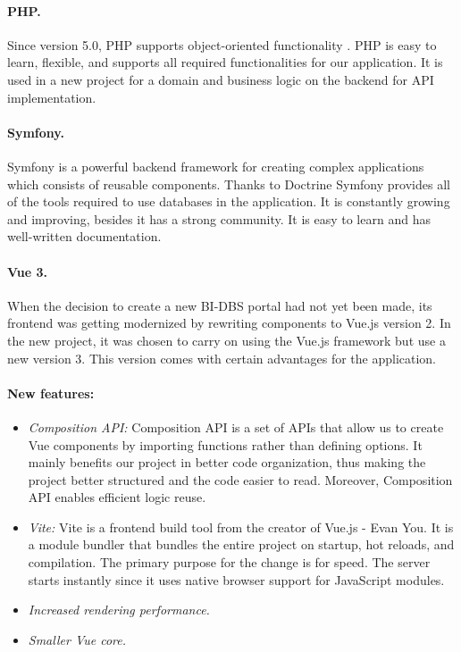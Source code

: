 \paragraph*{PHP.} Since version 5.0, PHP supports object-oriented functionality \cite{php-oop}. PHP is easy to learn, flexible, and supports all required functionalities for our application. It is used in a new project for a domain and business logic on the backend for API implementation.

\paragraph*{Symfony.} Symfony is a powerful backend framework for creating complex applications which consists of reusable components. \cite{symphony-doc} Thanks to Doctrine Symfony provides all of the tools required to use databases in the application. It is constantly growing and improving, besides it has a strong community. It is easy to learn and has well-written documentation.


\paragraph*{Vue 3.} When the decision to create a new BI-DBS portal had not yet been made, its frontend was getting modernized by rewriting components to Vue.js version 2. In the new project, it was chosen to carry on using the Vue.js framework but use a new version 3. This version comes with certain advantages for the application. \cite{vue3-updates}

\paragraph*{New features:}
\begin{itemize}
  \item \emph{Composition API:} Composition API is a set of APIs that allow us to create Vue components by importing functions rather than defining options. It mainly benefits our project in better code organization, thus making the project better structured and the code easier to read. Moreover, Composition API enables efficient logic reuse. \cite{compositionapi-doc}
  
  \item \emph{Vite:} Vite is a frontend build tool from the creator of Vue.js - Evan You. It is a module bundler that bundles the entire project on startup, hot reloads, and compilation. The primary purpose for the change is for speed. The server starts instantly since it uses native browser support for JavaScript modules. \cite{vite-doc}

  \item \emph{Increased rendering performance.}

  \item \emph{Smaller Vue core.}

\end{itemize}

